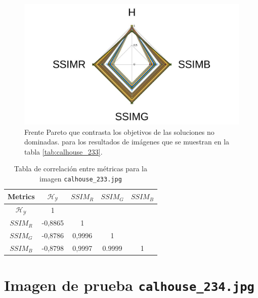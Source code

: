     \begin{figure}[H]
    \centering
    \includegraphics[width=\textwidth]{./Figures/calhouse_233/calhouse_233_2.jpg}
    \caption{Frente Pareto que contrasta los objetivos de las soluciones no dominadas. para los resultados de imágenes que se muestran en la tabla \ref{tab:calhouse_233}.}
    \label{fig:calhouse2332fp}
    \end{figure}

\begin{table}[H]
\setlength{\abovecaptionskip}{2pt plus 3pt minus 2pt} %
\caption[Parámetros de entrada para $MOPSO$]{Tabla de correlación entre métricas para la imagen \texttt{calhouse\_233.jpg}}
\begin{center}
 \begin{tabular}{||c | c c c c||} 
 \hline
Metrics & $\mathscr{H_Y}$ & $SSIM_R$ & $SSIM_G$ & $SSIM_B$ \\ 
\hline
$\mathscr{H_Y}$ & 1 &  &  & \\ 
\hline
$SSIM_R$ & -0,8865 & 1 &  \\ 
\hline
$SSIM_G$ & -0,8786 & 0,9996  & 1  & \\ 
\hline
$SSIM_B$ & -0,8798 & 0,9997  & 0.9999  & 1 \\ 
\hline
\end{tabular}
\end{center}
\label{table:correlacion}
\end{table}

\section{Imagen de prueba \texttt{calhouse\_234.jpg}}

